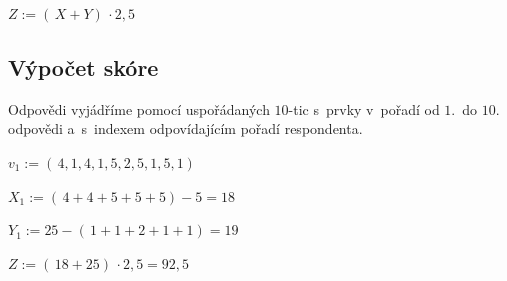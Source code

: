 \documentclass[12pt,a4paper]{report}
\let\openright=\clearpage
\begin{document}
$Z := ( \,X + Y) \, \cdot 2,5$

\subsection{Výpočet skóre}

Odpovědi vyjádříme pomocí uspořádaných $10$-tic s~prvky v~pořadí od $1$.~do $10$. odpovědi a~s~indexem odpovídajícím pořadí respondenta.

$v_1 := (\,4,1,4,1,5,2,5,1,5,1)\,$

$X_1 := (\,4 + 4 + 5 + 5 + 5) - 5 = 18\,$

$Y_1 := 25 - (\,1 + 1 + 2 + 1 + 1) = 19\,$

$Z := ( \,18 + 25) \, \cdot 2,5 = 92,5$

\openright
\end{document}
